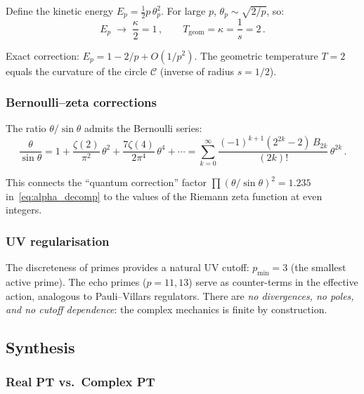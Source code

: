 \documentclass[12pt,a4paper]{article}
\begin{document}
Define the kinetic energy $E_p = \frac{1}{2}p\,\theta_p^2$.
For large $p$, $\theta_p \sim \sqrt{2/p}$, so:
\begin{equation}
  E_p \;\to\; \frac{\kappa}{2} = 1\,,\qquad
  T_{\mathrm{geom}} = \kappa = \frac{1}{s} = 2\,.
  \label{eq:equipartition}
\end{equation}

Exact correction: $E_p = 1 - 2/p + O(1/p^2)$.
The geometric temperature $T = 2$ equals the curvature of the circle
$\mathcal{C}$ (inverse of radius $s = 1/2$).

\subsubsection{Bernoulli--zeta corrections}

The ratio $\theta/\sin\theta$ admits the Bernoulli series:
\begin{equation}
  \frac{\theta}{\sin\theta}
  = 1 + \frac{\zeta(2)}{\pi^2}\,\theta^2
    + \frac{7\zeta(4)}{2\pi^4}\,\theta^4
    + \cdots
  = \sum_{k=0}^{\infty} \frac{(-1)^{k+1}(2^{2k}-2)\,B_{2k}}{(2k)!}\,\theta^{2k}\,.
  \label{eq:bernoulli}
\end{equation}

This connects the ``quantum correction'' factor
$\prod(\theta/\sin\theta)^2 = 1.235$ in~\eqref{eq:alpha_decomp} to the
values of the Riemann zeta function at even integers.

\subsubsection{UV regularisation}

The discreteness of primes provides a natural UV cutoff: $p_{\min} = 3$
(the smallest active prime). The echo primes ($p = 11, 13$) serve as
counter-terms in the effective action, analogous to Pauli--Villars
regulators. There are \emph{no divergences, no poles, and no cutoff
dependence}: the complex mechanics is finite by construction.


\subsection{Synthesis}
\label{sec:cx_synthesis}

\subsubsection{Real PT vs.\ Complex PT}
\end{document}
